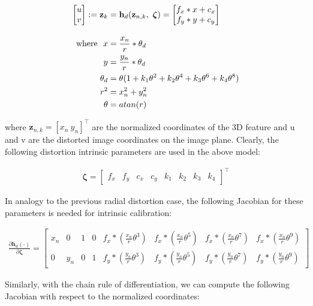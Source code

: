 \begin{align*} \begin{bmatrix} u \\ v \end{bmatrix}:= \mathbf{z}_k &= \mathbf h_d(\mathbf{z}_{n,k}, ~\boldsymbol\zeta) = \begin{bmatrix} f_x * x + c_x \\ f_y * y + c_y \end{bmatrix}\\[1em] \empty {\rm where}~~ x &= \frac{x_n}{r} * \theta_d \\ y &= \frac{y_n}{r} * \theta_d \\ \theta_d &= \theta (1 + k_1 \theta^2 + k_2 \theta^4 + k_3 \theta^6 + k_4 \theta^8) \\ \quad r^2 &= x_n^2 + y_n^2 \\ \theta &= atan(r) \end{align*}

where $ \mathbf{z}_{n,k} = [ x_n ~ y_n ]^\top$ are the normalized coordinates of the 3D feature and u and v are the distorted image coordinates on the image plane. Clearly, the following distortion intrinsic parameters are used in the above model\+:

\begin{align*} \boldsymbol\zeta = \begin{bmatrix} f_x & f_y & c_x & c_y & k_1 & k_2 & k_3 & k_4 \end{bmatrix}^\top \end{align*}

In analogy to the previous radial distortion case, the following Jacobian for these parameters is needed for intrinsic calibration\+:

\begin{align*} \frac{\partial \mathbf h_d (\cdot)}{\partial \boldsymbol\zeta} = \begin{bmatrix} x_n & 0 & 1 & 0 & f_x*(\frac{x_n}{r}\theta^3) & f_x*(\frac{x_n}{r}\theta^5) & f_x*(\frac{x_n}{r}\theta^7) & f_x*(\frac{x_n}{r}\theta^9) \\[5pt] 0 & y_n & 0 & 1 & f_y*(\frac{y_n}{r}\theta^3) & f_y*(\frac{y_n}{r}\theta^5) & f_y*(\frac{y_n}{r}\theta^7) & f_y*(\frac{y_n}{r}\theta^9) \end{bmatrix} \end{align*}

Similarly, with the chain rule of differentiation, we can compute the following Jacobian with respect to the normalized coordinates\+:

